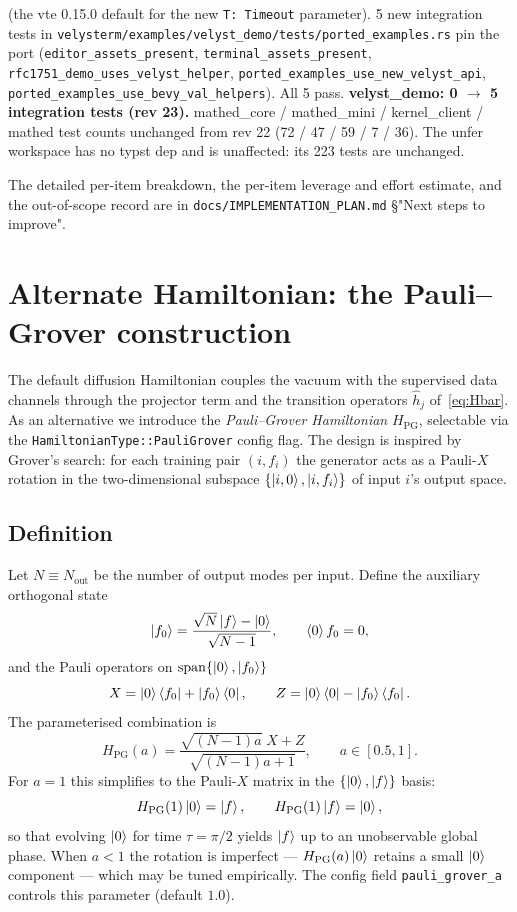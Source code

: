 \documentclass[11pt, a4paper]{article}
\begin{document}
\begin{enumerate}
  (the vte 0.15.0 default for the new \texttt{T: Timeout}
  parameter). 5 new integration tests in
  \texttt{velysterm/examples/velyst\_demo/tests/ported\_examples.rs}
  pin the port (\texttt{editor\_assets\_present},
  \texttt{terminal\_assets\_present},
  \texttt{rfc1751\_demo\_uses\_velyst\_helper},
  \texttt{ported\_examples\_use\_new\_velyst\_api},
  \texttt{ported\_examples\_use\_bevy\_val\_helpers}). All 5 pass.
  \textbf{velyst\_demo: 0 $\to$ 5 integration tests (rev 23).}
  mathed\_core / mathed\_mini / kernel\_client / mathed test
  counts unchanged from rev 22 (72 / 47 / 59 / 7 / 36). The
  unfer workspace has no typst dep and is unaffected: its
  223 tests are unchanged.
\end{enumerate}

The detailed per-item breakdown, the per-item leverage and
effort estimate, and the out-of-scope record are in
\texttt{docs/IMPLEMENTATION\_PLAN.md} \S"Next steps to improve".

\section{Alternate Hamiltonian: the Pauli--Grover construction}
\label{sec:pauli-grover}

The default diffusion Hamiltonian couples the vacuum with the supervised
data channels through the projector term and the transition operators
$\hat h_j$ of~\eqref{eq:Hbar}. As an alternative we introduce the
\emph{Pauli--Grover Hamiltonian} $H_{\mathrm{PG}}$, selectable via the
\texttt{HamiltonianType::PauliGrover} config flag. The design is inspired
by Grover's search: for each training pair $(i,f_i)$ the generator acts as a
Pauli-$X$ rotation in the two-dimensional subspace
$\{\ket{i,0},\ket{i,f_i}\}$ of input $i$'s output space.

\subsection{Definition}

Let $N\equiv N_{\mathrm{out}}$ be the number of output modes per input.
Define the auxiliary orthogonal state
\[
\ket{f_0} = \frac{\sqrt{N}\ket{f} - \ket{0}}{\sqrt{N-1}},
\qquad \braket{0}{f_0}=0,
\]
and the Pauli operators on $\operatorname{span}\{\ket{0},\ket{f_0}\}$
\[
X = \ket{0}\bra{f_0} + \ket{f_0}\bra{0},\qquad
Z = \ket{0}\bra{0} - \ket{f_0}\bra{f_0}.
\]
The parameterised combination is
\[
H_{\mathrm{PG}}(a)
= \frac{\sqrt{(N-1)a}\;X + Z}{\sqrt{(N-1)a+1}},
\qquad a\in[0.5,1].
\]
For $a=1$ this simplifies to the Pauli-$X$ matrix in the
$\{\ket{0},\ket{f}\}$ basis:
\[
H_{\mathrm{PG}}(1)\ket{0} = \ket{f},\qquad
H_{\mathrm{PG}}(1)\ket{f} = \ket{0},
\]
so that evolving $\ket{0}$ for time $\tau=\pi/2$ yields $\ket{f}$ up to an
unobservable global phase. When $a<1$ the rotation is imperfect ---
$H_{\mathrm{PG}}(a)\ket{0}$ retains a small $\ket{0}$ component --- which may
be tuned empirically. The config field \texttt{pauli\_grover\_a} controls
this parameter (default $1.0$).
\end{document}
